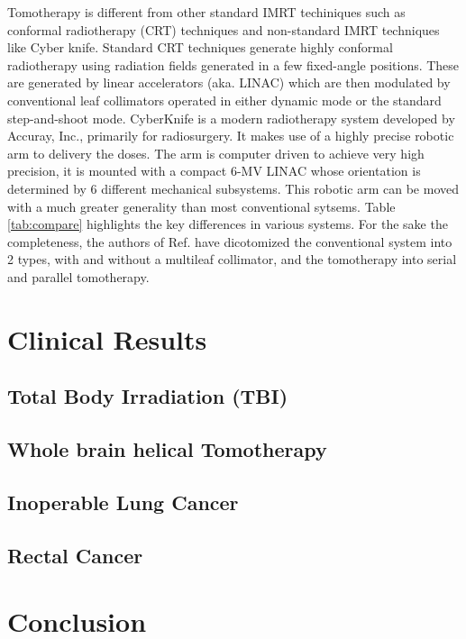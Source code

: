 \documentclass[10pt,journal,compsoc]{IEEEtran} %
\begin{document}
  Tomotherapy is different from other standard IMRT techiniques such as 
  conformal radiotherapy (CRT) techniques and non-standard IMRT techniques like 
  Cyber knife.   Standard CRT techniques generate highly conformal radiotherapy 
  using radiation fields generated in a few fixed-angle positions. These are 
  generated by linear accelerators (aka. LINAC) which are then modulated by 
  conventional leaf collimators operated in either dynamic mode or the standard 
  step-and-shoot mode. CyberKnife is a modern radiotherapy system developed by 
  Accuray, Inc., primarily for radiosurgery. It makes use of a highly precise 
  robotic arm to delivery the doses. The arm is computer driven to achieve very 
  high precision, it is mounted with a compact 6-MV LINAC whose orientation is 
  determined by 6 different mechanical subsystems. This robotic arm can be 
  moved with a much greater generality than most conventional sytsems. Table 
  \ref{tab:compare} highlights the key differences in various systems. For the 
  sake the completeness, the authors of Ref. \cite{Fenwick2006} have 
  dicotomized the conventional system into 2 types, with and without a 
  multileaf collimator, and the tomotherapy into serial and parallel 
  tomotherapy.
  \section{Clinical Results}
  \label{clinical}
  \subsection{Total Body Irradiation (TBI)}
  \subsection{Whole brain helical Tomotherapy}
  \subsection{Inoperable Lung Cancer}
  \subsection{Rectal Cancer}
  \section{Conclusion}
  \label{conclusions}
  {}
  
  
\end{document}
